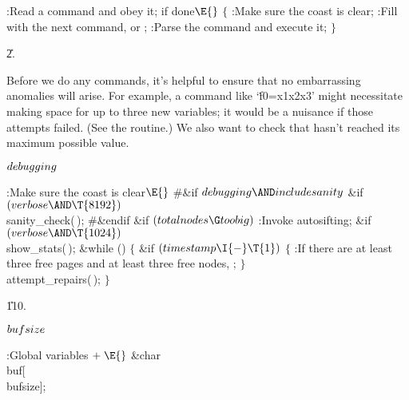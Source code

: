 \Y\B\4:Read a command and obey it;  if done\X${}%
\E{}$\6
${}\{{}$\1\6
:Make sure the coast is clear\X;\6
:Fill  with the next command, or \X;\6
:Parse the command and execute it\X;\6
\4${}\}{}$\2\par
\U2.\fi

Before we do any commands, it's helpful to ensure that no embarrassing
anomalies will arise. For example, a command like `\.{f0=x1{\tta}x2{\tta}x3}'
might necessitate making space for up to three new variables;
it would be a nuisance if those attempts failed. (See the
 routine.) We also want to check that 
hasn't
reached its maximum possible value.

\Y\B\4\D$\\{debugging}$ \5
\par
\Y\B\4:Make sure the coast is clear\X${}\E{}$\6
\8\#\&{if} ${}\\{debugging}\AND\\{includesanity}{}$\6
\&{if} ${}(\\{verbose}\AND\T{8192}){}$\1\5
\\{sanity\_check}(\,);\2\6
\8\#\&{endif}\6
\&{if} ${}(\\{totalnodes}\G\\{toobig}){}$\1\5
:Invoke autosifting\X;\2\6
\&{if} ${}(\\{verbose}\AND\T{1024}){}$\1\5
\\{show\_stats}(\,);\2\6
\&{while} ()\5
${}\{{}$\1\6
\&{if} ${}(\\{timestamp}\I{-}\T{1}){}$\5
${}\{{}$\1\6
:If there are at least three free pages and at least three free nodes, \X;\6
\4${}\}{}$\2\6
\\{attempt\_repairs}(\,);\6
\4${}\}{}$\2\par
\U110.\fi

\Y\B\4\D$\\{bufsize}$ \5
\par
\Y\B\4:Global variables\X${}\mathrel+\E{}$\6
\&{char} \\{buf}[\\{bufsize}];\par
\fi

